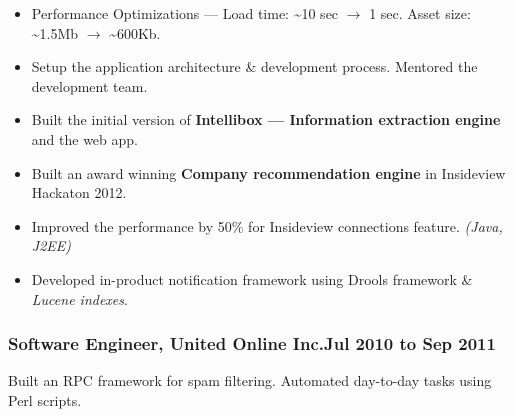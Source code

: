 \documentclass{resume}
\begin{document}
\begin{itemize} \itemsep1pt \parskip0pt
  \item Performance Optimizations --- Load time: \textasciitilde10 sec \( \rightarrow \) 1 sec.  
    Asset size: \textasciitilde1.5Mb \( \rightarrow \) \textasciitilde600Kb.
  \item Setup the application architecture \& development process. Mentored the development team.
\end{itemize}
\begin{itemize} \itemsep1pt \parskip0pt
  \item Built the initial version of \textbf{Intellibox --- Information extraction engine} and the web app.
\end{itemize}
\begin{itemize} \itemsep1pt \parskip0pt
  \item Built an award winning \textbf{Company recommendation engine} in Insideview Hackaton 2012.
  \item Improved the performance by 50\% for Insideview connections feature. \textit{(Java, J2EE)}
  \item Developed in-product notification framework using Drools framework \& \textit{Lucene indexes}.
\end{itemize}
\subsubsection[Software Engineer, UOL]{Software Engineer, United Online Inc.\hfill Jul 2010 to Sep 2011}
\par Built an RPC framework for spam filtering.  Automated day-to-day tasks using Perl scripts.
\end{document}
